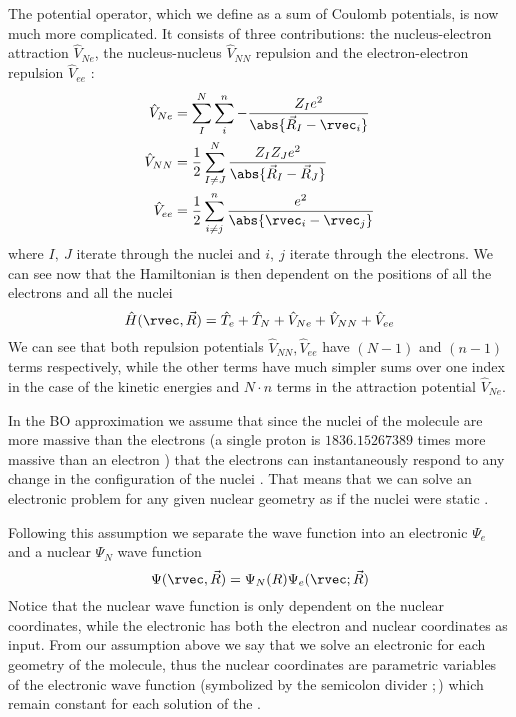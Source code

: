 \documentclass[../master_thesis.tex]{subfiles}
\begin{document}
The potential operator, which we define as a sum of Coulomb potentials, is now much more
complicated. It consists of three contributions: the nucleus-electron attraction
$\hat{V}_{Ne}$, the nucleus-nucleus $\hat{V}_{NN}$ repulsion and the electron-electron
repulsion $\hat{V}_{ee}$ \cite{Cramer:2004}:
\begin{align}
  \hat{V}_{Ne} &= \sum^N_I\sum^n_{i}-\frac{Z_Ie^2}{\abs{\vec{R}_I - \rvec_i}}\\
  \hat{V}_{NN} &= \frac{1}{2}\sum^N_{I \neq J}\frac{Z_IZ_Je^2}{\abs{\vec{R}_I - \vec{R}_J}}\\
  \hat{V}_{ee} &= \frac{1}{2}\sum^n_{i \neq j} \frac{e^2}{\abs{\rvec_i - \rvec_j}}
\end{align}
where $I,\ J$ iterate through the nuclei and $i, \ j$ iterate through the electrons.
We can see now that the Hamiltonian is then dependent on the positions of all the electrons and all
the nuclei \cite{Jensen:2017}
\begin{equation}
  \hat{H}(\rvec, \vec{R}) = \hat{T}_e + \hat{T}_N + \hat{V}_{Ne} +\hat{V}_{NN} + \hat{V}_{ee}
\end{equation}
We can see that both repulsion potentials $\hat{V}_{NN}, \hat{V}_{ee}$ have $(N - 1)$ and $(n - 1)$ terms
respectively, while the other terms have much simpler sums over one index in the case of the
kinetic energies and $N\cdot n$ terms in the attraction potential $\hat{V}_{Ne}$.

In the \ac{BO} approximation we assume that since the nuclei of the molecule are more massive
than the electrons (a single proton is $1836.152 673 89$ times more massive
than an electron \cite{NIST:2019}) that the electrons can instantaneously respond to
any change in the configuration of the nuclei \cite{Atkins:2011}. That means that we can solve an
electronic problem for any given nuclear geometry as if the nuclei were static
\cite{Cramer:2004, Jensen:2017, Atkins:2014}.

Following this  assumption we separate the wave function into an electronic
$\Psi_e$ and a nuclear $\Psi_N$ wave function
\begin{equation}
  \Psi(\rvec, \vec{R}) = \Psi_N(R)\Psi_e(\rvec; \vec{R})
\end{equation}
Notice that the nuclear wave function is only dependent on the nuclear coordinates,
while the electronic has both the electron and nuclear coordinates as input. From
our assumption above we say that we solve an electronic \SE for each geometry
of the molecule, thus the nuclear coordinates  are parametric variables of
the electronic wave function (symbolized by the semicolon divider $;$) which remain
constant for each solution of the \SE.
\end{document}
